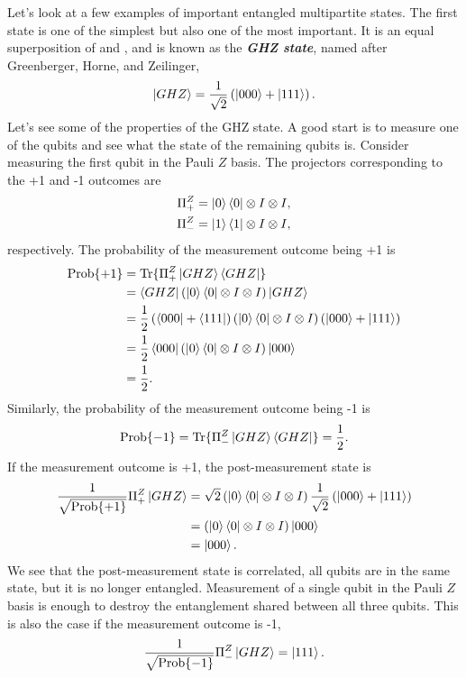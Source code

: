 Let's look at a few examples of important entangled multipartite states.
The first state is one of the simplest but also one of the most important.
It is an equal superposition of  and , and is known as the \textit{\textbf{GHZ state}}, named after Greenberger, Horne, and Zeilinger,
\begin{equation}
    \left| GHZ \right\rangle = \frac{1}{\sqrt{2}} \left( \left| 000 \right\rangle + \left| 111 \right\rangle \right).
\end{equation}
Let's see some of the properties of the GHZ state.
A good start is to measure one of the qubits and see what the state of the remaining qubits is.
Consider measuring the first qubit in the Pauli $Z$ basis.
The projectors corresponding to the +1 and -1 outcomes are
\begin{align}
    \Pi^Z_+ & = \left| 0 \right\rangle\left\langle 0 \right| \otimes I \otimes I, \\
    \Pi^Z_- & = \left| 1 \right\rangle\left\langle 1 \right| \otimes I \otimes I,
\end{align}
respectively.
The probability of the measurement outcome being +1 is
\begin{align}
    \text{Prob} \{+1\} & = \text{Tr} \{ \Pi^Z_+ \left| GHZ \right\rangle\left\langle GHZ \right| \} \nonumber\\
    & = \left\langle GHZ \right| \left( \left| 0 \right\rangle\left\langle 0 \right| \otimes I \otimes I \right) \left| GHZ \right\rangle \nonumber\\
    & = \frac{1}{2} \left( \left\langle 000 \right| + \left\langle 111 \right| \right) \left( \left| 0 \right\rangle\left\langle 0 \right| \otimes I \otimes I \right) \left( \left| 000 \right\rangle + \left| 111 \right\rangle \right) \nonumber\\
     & = \frac{1}{2} \left\langle 000 \right| \left( \left| 0 \right\rangle\left\langle 0 \right| \otimes I \otimes I \right) \left| 000 \right\rangle \nonumber\\
     & = \frac{1}{2}.
\end{align}
Similarly, the probability of the measurement outcome being -1 is
\begin{equation}
    \text{Prob}\{-1\} = \text{Tr}\{\Pi^Z_-\left| GHZ \right\rangle\left\langle GHZ \right|\} = \frac{1}{2}.
\end{equation}
If the measurement outcome is +1, the post-measurement state is
\begin{align}
    \frac{1}{\sqrt{\text{Prob}\{+1\}}} \Pi^Z_+ \left| GHZ \right\rangle & = \sqrt{2} \left( \left| 0 \right\rangle\left\langle 0 \right| \otimes I \otimes I \right) \frac{1}{\sqrt{2}} \left( \left| 000 \right\rangle + \left| 111 \right\rangle \right) \nonumber\\
    & = \left( \left| 0 \right\rangle\left\langle 0 \right| \otimes I \otimes I \right) \left| 000 \right\rangle \nonumber\\
    & = \left| 000 \right\rangle.
\end{align}
We see that the post-measurement state is correlated, all qubits are in the same state, but it is no longer entangled.
Measurement of a single qubit in the Pauli $Z$ basis is enough to destroy the entanglement shared between all three qubits.
This is also the case if the measurement outcome is -1,
\begin{equation}
    \frac{1}{\sqrt{\text{Prob}\{-1\}}} \Pi^Z_- \left| GHZ \right\rangle = \left| 111 \right\rangle.
\end{equation}

